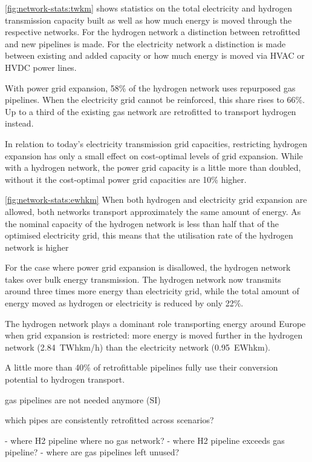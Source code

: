 \cref{fig:network-stats:twkm} shows statistics on the total electricity and
hydrogen transmission capacity built as well as how much energy is moved through
the respective networks. For the hydrogen network a distinction between
retrofitted and new pipelines is made. For the electricity network a distinction
is made between existing and added capacity or how much energy is moved via HVAC
or HVDC power lines.

With power grid expansion, 58\% of the hydrogen network uses repurposed gas
pipelines. When the electricity grid cannot be reinforced, this share rises to
66\%. Up to a third of the existing gas network are retrofitted to transport
hydrogen instead.

In relation to today's electricity transmission grid capacities, restricting
hydrogen expansion has only a small effect on cost-optimal levels of grid
expansion. While with a hydrogen network, the power grid capacity is a little
more than doubled, without it the cost-optimal power grid capacities are 10\%
higher.

\cref{fig:network-stats:ewhkm}
When both hydrogen and electricity grid expansion are allowed,
both networks transport approximately the same amount of energy.
As the nominal capacity of the hydrogen network is less than half that of the
optimised electricity grid, this means that the utilisation rate of
the hydrogen network is higher 

For the case where power grid expansion is disallowed, the hydrogen network
takes over bulk energy transmission. The hydrogen network now transmits around three
times more energy than electricity grid, while the total amount of energy moved
as hydrogen or electricity is reduced by only 22\%.

The hydrogen network plays a
dominant role transporting energy around Europe when grid expansion is
restricted: more energy is moved further in the hydrogen network (2.84~TWhkm/h)
than the electricity network (0.95~EWhkm).

A little more than 40\% of retrofittable pipelines fully use their conversion
potential to hydrogen transport.

gas pipelines are not needed anymore (SI)

which pipes are consistently retrofitted across scenarios?

- where H2 pipeline where no gas network?
- where H2 pipeline exceeds gas pipeline?
- where are gas pipelines left unused?

